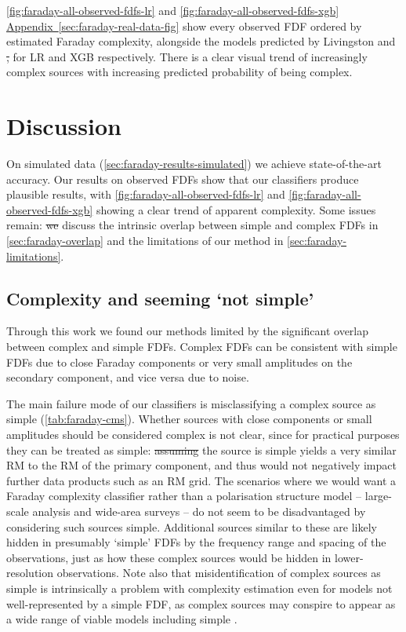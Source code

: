 \documentclass[11pt, a4paper]{book}
\newcommand{\aref}[1]{\hyperref[#1]{Appendix~\ref{#1}}}
\providecommand{\DIFaddtex}[1]{{\protect\color{blue}\uwave{#1}}} %
\providecommand{\DIFdeltex}[1]{{\protect\color{red}\sout{#1}}}                      %
\providecommand{\DIFaddbegin}{} %
\providecommand{\DIFaddend}{} %
\providecommand{\DIFdelbegin}{} %
\providecommand{\DIFdelend}{} %
\providecommand{\DIFadd}[1]{\texorpdfstring{\DIFaddtex{#1}}{#1}} %
\providecommand{\DIFdel}[1]{\texorpdfstring{\DIFdeltex{#1}}{}} %
\newcommand{\DIFscaledelfig}{0.5}
\newlength{\DIFdelgraphicswidth} %
\newlength{\DIFdelgraphicsheight} %
\newcommand{\DIFaddincludegraphics}[2][]{{\color{blue}\fbox{\DIFOincludegraphics[#1]{#2}}}} %
\newcommand{\DIFdelincludegraphics}[2][]{%
\sbox{\DIFdelgraphicsbox}{\DIFOincludegraphics[#1]{#2}}%
\settoboxwidth{\DIFdelgraphicswidth}{\DIFdelgraphicsbox} %
\settoboxtotalheight{\DIFdelgraphicsheight}{\DIFdelgraphicsbox} %
\scalebox{\DIFscaledelfig}{%
\parbox[b]{\DIFdelgraphicswidth}{\usebox{\DIFdelgraphicsbox}\\[-\baselineskip] \rule{\DIFdelgraphicswidth}{0em}}\llap{\resizebox{\DIFdelgraphicswidth}{\DIFdelgraphicsheight}{%
\setlength{\unitlength}{\DIFdelgraphicswidth}%
\begin{picture}(1,1)%
\thicklines\linethickness{2pt} %
{\color[rgb]{1,0,0}\put(0,0){\framebox(1,1){}}}%
{\color[rgb]{1,0,0}\put(0,0){\line( 1,1){1}}}%
{\color[rgb]{1,0,0}\put(0,1){\line(1,-1){1}}}%
\end{picture}%
}\hspace*{3pt}}} %
} %
\DeclareRobustCommand{\DIFaddbegin}{\DIFOaddbegin \let\includegraphics\DIFaddincludegraphics} %
\DeclareRobustCommand{\DIFaddend}{\DIFOaddend \let\includegraphics\DIFOincludegraphics} %
\DeclareRobustCommand{\DIFdelbegin}{\DIFOdelbegin \let\includegraphics\DIFdelincludegraphics} %
\DeclareRobustCommand{\DIFdelend}{\DIFOaddend \let\includegraphics\DIFOincludegraphics} %
\begin{document}
    \autoref{fig:faraday-all-observed-fdfs-lr} and \autoref{fig:faraday-all-observed-fdfs-xgb} \DIFaddbegin \DIFadd{in }\aref{sec:faraday-real-data-fig} \DIFaddend show every observed FDF ordered by estimated Faraday complexity, alongside the models predicted by Livingston and \citet{osullivan_broad-band_2017} \DIFdelbegin \DIFdel{, }\DIFdelend for LR and XGB respectively. There is a clear visual trend of increasingly complex sources with increasing predicted probability of being complex.

\section{Discussion}
\label{sec:faraday-discussion}

  On simulated data (\autoref{sec:faraday-results-simulated}) we achieve state-of-the-art accuracy. Our results on observed FDFs show that our classifiers produce plausible results, with \autoref{fig:faraday-all-observed-fdfs-lr} and \autoref{fig:faraday-all-observed-fdfs-xgb} showing a clear trend of apparent complexity. Some issues remain: \DIFdelbegin \DIFdel{we }\DIFdelend \DIFaddbegin \DIFadd{We }\DIFaddend discuss the intrinsic overlap between simple and complex FDFs in \autoref{sec:faraday-overlap} and the limitations of our method in \autoref{sec:faraday-limitations}.

  \subsection{Complexity and seeming `not simple'}
  \label{sec:faraday-overlap}

    Through this work we found our methods limited by the significant overlap between complex and simple FDFs. Complex FDFs can be consistent with simple FDFs due to close Faraday components or very small amplitudes on the secondary component, and vice versa due to noise.

    The main failure mode of our classifiers is misclassifying a complex source as simple (\autoref{tab:faraday-cms}). Whether sources with close components or small amplitudes should be considered complex is not clear, since for practical purposes they can be treated as simple: \DIFdelbegin \DIFdel{assuming }\DIFdelend \DIFaddbegin \DIFadd{Assuming }\DIFaddend the source is simple yields a very similar RM to the RM of the primary component, and thus would not negatively impact further data products such as an RM grid. The scenarios where we would want a Faraday complexity classifier rather than a polarisation structure model -- large-scale analysis and wide-area surveys -- do not seem to be disadvantaged by considering such sources simple. Additional sources similar to these are likely hidden in presumably `simple' FDFs by the frequency range and spacing of the observations, just as how these complex sources would be hidden in lower-resolution observations. Note also that misidentification of complex sources as simple is intrinsically a problem with complexity estimation even for models not well-represented by a simple FDF, as complex sources may conspire to appear as a wide range of viable models including simple \citep{sun15comparison}.
\end{document}
